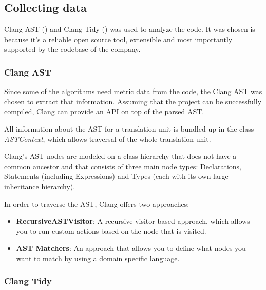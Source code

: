 \documentclass{article}
\begin{document}

\subsection{Collecting data}

Clang AST (\cite{clang_ast}) and Clang Tidy (\cite{clang_tidy}) was used to analyze the code. It was chosen is because it's a reliable open source tool, extensible and most importantly supported by the codebase of the company.

\subsubsection{Clang AST}
Since some of the algorithms need metric data from the code, the Clang AST was chosen to extract that information. Assuming that the project can be successfully compiled, Clang can provide an API on top of the parsed AST.  

All information about the AST for a translation unit is bundled up in the class \textit{ASTContext}, which allows traversal of the whole translation unit.

Clang’s AST nodes are modeled on a class hierarchy that does not have a common ancestor and that consists of three main node types: Declarations, Statements (including Expressions) and Types (each with its own large inheritance hierarchy).

In order to traverse the AST, Clang offers two approaches:
\begin{itemize}
	\item \textbf{RecursiveASTVisitor}: A recursive visitor based approach, which allows you to run custom actions based on the node that is visited.
	\item \textbf{AST Matchers}: An approach that allows you to define what nodes you want to match by using a domain specific language.
\end{itemize}

\subsubsection{Clang Tidy}
\end{document}
